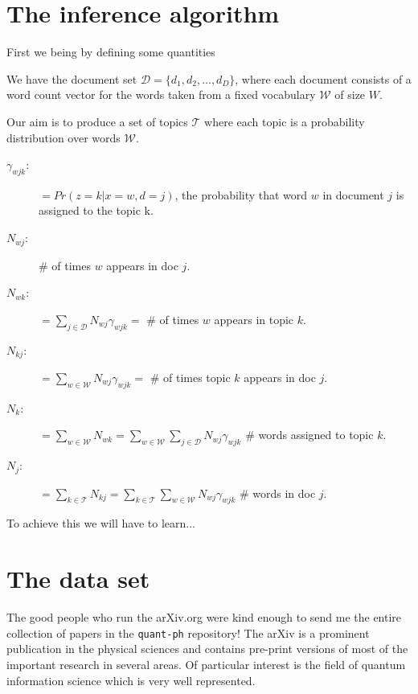 \documentclass[11pt]{article}
\newcommand{\DD}{\mathcal{D}}
\newcommand{\WW}{\mathcal{W}}
\newcommand{\TT}{\mathcal{T}}
\begin{document}
\section{The inference algorithm}

    First we being by defining some quantities
    
    We have the document set $\DD = \{ d_1, d_2, \ldots, d_D \}$, where each document consists of 
    a word count vector for the words taken from a fixed vocabulary $\WW$ of size $W$.
    
    Our aim is to produce a set of topics $\TT$ where each topic is a probability distribution over words $\WW$.
    
    
    \begin{description}
	\item[$\gamma_{wjk}$:]	$=Pr( z=k | x=w,d=j)$, the probability that word $w$ in document $j$ 
						is assigned to the topic k.
	\item[$N_{wj}$:]	\# of times $w$ appears in doc $j$. 
	\item[$N_{wk}$:]  $=\displaystyle\sum_{j\in \DD} N_{wj}\gamma_{wjk} = $ \# of times $w$ appears in topic $k$.
	\item[$N_{kj}$:]  $=\displaystyle\sum_{w\in \WW} N_{wj}\gamma_{wjk} = $ \# of times topic $k$ appears in doc $j$.
	\item[$N_{k}$:]  $=\displaystyle\sum_{w\in \WW} N_{wk}=  \displaystyle\sum_{w\in \WW}\sum_{j\in \DD} N_{wj}\gamma_{wjk} $ \# words assigned to  topic $k$.
	\item[$N_{j}$: ]  $=\displaystyle\sum_{k \in \TT} N_{kj} =  \displaystyle\sum_{k \in \TT}\sum_{w\in \WW}N_{wj}\gamma_{wjk} $ \# words in doc $j$.
    \end{description}


    To achieve this we will have to learn...


\section{The data set} \label{section:data-set}

	The good people who run the arXiv.org were kind enough to send me the entire collection of papers
	in the \texttt{quant-ph} repository! 
    The arXiv is a prominent publication in the physical sciences and contains pre-print versions
    of most of the important research in several areas.
    Of particular interest is the field of quantum information science which is very well
    represented.
	
\end{document}
